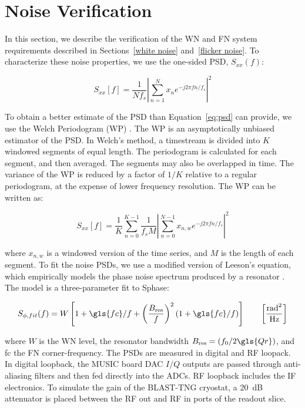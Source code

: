 \section{Noise Verification}\label{noise verify}

In this section, we describe the verification of the WN and FN system requirements described in Sections~\ref{white noise} and~\ref{flicker noise}. To characterize these noise properties, we use the one-sided PSD, $S_{xx}(f)$:

\begin{equation}\label{eq:psd}
  S_{xx}[f]={\frac {1}{N f_{s}}}\left|\sum _{n=1}^{N}x_{n}e^{-j2\pi f n/f_{s}}\right|^{2}
\end{equation}

To obtain a better estimate of the PSD than Equation~\ref{eq:psd} can provide, we use the Welch Periodogram (WP) \citep{welch1967use}. The WP is an asymptotically unbiased estimator of the PSD. In Welch's method, a timestream is divided into $K$ windowed segments of equal length. The periodogram is calculated for each segment, and then averaged. The segments may also be overlapped in time. The variance of the WP is reduced by a factor of $1/K$ relative to a regular periodogram, at the expense of lower frequency resolution. The WP can be written as:

\begin{equation}\label{eq:WP}
S_{xx}[f] = \frac{1}{K} \sum_{n=0}^{K - 1}\frac{1}{f_{s} M} \left| \sum_{n=0}^{N - 1} x_{n,w} e^{-j2\pi f n / f_{s} }\right|^{2}
\end{equation}

where $x_{n,w}$ is a windowed version of the time series, and $M$ is the length of each segment. To fit the noise PSDs, we use a modified version of Leeson's equation, which empirically models the phase noise spectrum produced by a resonator \citep{lesson1966simple}. The model is a three-parameter fit to \gls{Sphase}:

\begin{equation}\label{eq:PSD fit}
  S_{\phi,fit}(f) = W\left[ 1 + \gls{fc}/f + \left( \frac{B_{\mathrm{res}}}{f} \right)^{2} (1 + \gls{fc}/f) \right] \qquad \left[  \frac{\mathrm{rad}^{2}}{\mathrm{Hz}} \right]
\end{equation}

where $W$ is the WN level, the resonator bandwidth $B_{\mathrm{res}} = (f_{0}/2\gls{Qr})$, and \gls{fc} the FN corner-frequency. The PSDs are measured in digital and RF loopack. In digital loopback, the MUSIC board DAC $I/Q$ outputs are passed through anti-aliasing filters and then fed directly into the ADCs. RF loopback includes the IF electronics. To simulate the gain of the BLAST-TNG cryostat, a 20~dB attenuator is placed between the RF out and RF in ports of the readout slice.

